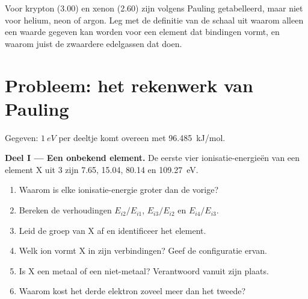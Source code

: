 \begin{exercise}[$\star\star\star$]\label{exo:b1:periodicity:12}
Voor krypton (3.00) en xenon (2.60) zijn  volgens
Pauling getabelleerd, maar niet voor helium, neon of argon. Leg met de
definitie van de schaal uit waarom alleen een waarde gegeven kan worden
voor een element dat bindingen vormt, en waarom juist de zwaardere
edelgassen dat doen.
\end{exercise}


\section{Probleem: het rekenwerk van Pauling}

\begin{problem}
\label{pb:b1:periodicity:1}
Gegeven: $\qty{1}{eV}$ per deeltje komt overeen met \qty{96.485}{kJ/mol}.

\medskip
\noindent\textbf{Deel I --- Een onbekend element.}
De eerste vier ionisatie-energieën van een element X uit  3 zijn
7.65, 15.04, 80.14 en \qty{109.27}{eV}.
\begin{enumerate}
  \item Waarom is elke ionisatie-energie groter dan de vorige?
  \item Bereken de verhoudingen $E_{i2}/E_{i1}$, $E_{i3}/E_{i2}$ en
        $E_{i4}/E_{i3}$.
  \item Leid de groep van X af en identificeer het element.
  \item Welk ion vormt X in zijn verbindingen? Geef de configuratie ervan.
  \item Is X een metaal of een niet-metaal? Verantwoord vanuit zijn plaats.
  \item Waarom kost het derde elektron zoveel meer dan het tweede?
\end{enumerate}


\end{problem}
